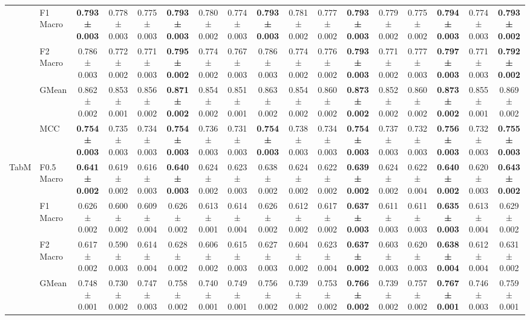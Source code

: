 \begin{table}[H]
{\begin{tabular}{llccccccccccccccc}
 & F1 Macro & \textbf{0.793 ± 0.003} & 0.778 ± 0.003 & 0.775 ± 0.003 & \textbf{0.793 ± 0.003} & 0.780 ± 0.002 & 0.774 ± 0.003 & \textbf{0.793 ± 0.003} & 0.781 ± 0.002 & 0.777 ± 0.002 & \textbf{0.793 ± 0.003} & 0.779 ± 0.002 & 0.775 ± 0.002 & \textbf{0.794 ± 0.003} & 0.774 ± 0.003 & \textbf{0.793 ± 0.002} \\
 & F2 Macro & 0.786 ± 0.003 & 0.772 ± 0.002 & 0.771 ± 0.003 & \textbf{0.795 ± 0.002} & 0.774 ± 0.002 & 0.767 ± 0.003 & 0.786 ± 0.003 & 0.774 ± 0.002 & 0.776 ± 0.002 & \textbf{0.793 ± 0.003} & 0.771 ± 0.002 & 0.777 ± 0.003 & \textbf{0.797 ± 0.003} & 0.771 ± 0.003 & \textbf{0.792 ± 0.002} \\
 & GMean & 0.862 ± 0.002 & 0.853 ± 0.001 & 0.856 ± 0.002 & \textbf{0.871 ± 0.002} & 0.854 ± 0.002 & 0.851 ± 0.001 & 0.863 ± 0.002 & 0.854 ± 0.002 & 0.860 ± 0.002 & \textbf{0.873 ± 0.002} & 0.852 ± 0.002 & 0.860 ± 0.002 & \textbf{0.873 ± 0.002} & 0.855 ± 0.001 & 0.869 ± 0.002 \\
 & MCC & \textbf{0.754 ± 0.003} & 0.735 ± 0.003 & 0.734 ± 0.003 & \textbf{0.754 ± 0.003} & 0.736 ± 0.003 & 0.731 ± 0.003 & \textbf{0.754 ± 0.003} & 0.738 ± 0.003 & 0.734 ± 0.003 & \textbf{0.754 ± 0.003} & 0.737 ± 0.003 & 0.732 ± 0.003 & \textbf{0.756 ± 0.003} & 0.732 ± 0.003 & \textbf{0.755 ± 0.003} \\
\cline{1-17}
\multirow[t]{5}{*}{TabM} & F0.5 Macro & \textbf{0.641 ± 0.002} & 0.619 ± 0.002 & 0.616 ± 0.003 & \textbf{0.640 ± 0.003} & 0.624 ± 0.002 & 0.623 ± 0.003 & 0.638 ± 0.002 & 0.624 ± 0.002 & 0.622 ± 0.002 & \textbf{0.639 ± 0.002} & 0.624 ± 0.002 & 0.622 ± 0.004 & \textbf{0.640 ± 0.002} & 0.620 ± 0.003 & \textbf{0.643 ± 0.002} \\
 & F1 Macro & 0.626 ± 0.002 & 0.600 ± 0.002 & 0.609 ± 0.004 & 0.626 ± 0.002 & 0.613 ± 0.001 & 0.614 ± 0.004 & 0.626 ± 0.002 & 0.612 ± 0.002 & 0.617 ± 0.002 & \textbf{0.637 ± 0.003} & 0.611 ± 0.003 & 0.611 ± 0.003 & \textbf{0.635 ± 0.003} & 0.613 ± 0.004 & 0.629 ± 0.002 \\
 & F2 Macro & 0.617 ± 0.002 & 0.590 ± 0.003 & 0.614 ± 0.004 & 0.628 ± 0.002 & 0.606 ± 0.002 & 0.615 ± 0.003 & 0.627 ± 0.003 & 0.604 ± 0.002 & 0.623 ± 0.004 & \textbf{0.637 ± 0.002} & 0.603 ± 0.003 & 0.620 ± 0.003 & \textbf{0.638 ± 0.004} & 0.612 ± 0.004 & 0.631 ± 0.002 \\
 & GMean & 0.748 ± 0.001 & 0.730 ± 0.002 & 0.747 ± 0.003 & 0.758 ± 0.002 & 0.740 ± 0.001 & 0.749 ± 0.001 & 0.756 ± 0.002 & 0.739 ± 0.002 & 0.753 ± 0.002 & \textbf{0.766 ± 0.002} & 0.739 ± 0.002 & 0.757 ± 0.002 & \textbf{0.767 ± 0.001} & 0.746 ± 0.003 & 0.759 ± 0.001 \\

\end{tabular}}
\end{table}

